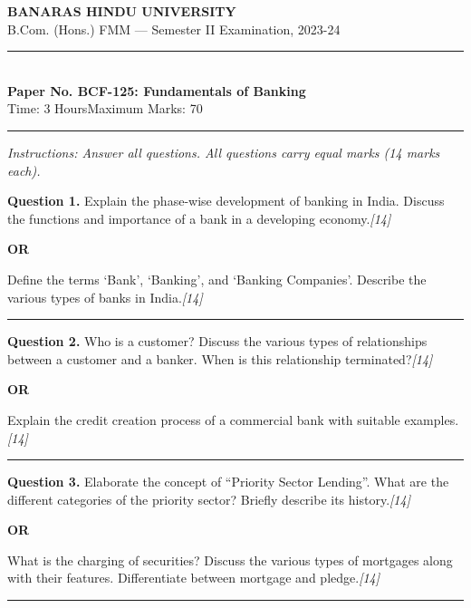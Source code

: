 \documentclass[11pt,a4paper]{article}
\newcommand{\pts}[1]{\hfill   \textit{[#1]}}
\begin{document}
\begin{center}
  {\large\bfseries BANARAS HINDU UNIVERSITY}\\[2pt]
  {\normalsize B.Com. (Hons.) FMM --- Semester II Examination, 2023-24}\\[6pt]
  \rule{0.8\linewidth}{0.5pt}\\[6pt]
  {\large\bfseries Paper No. BCF-125: Fundamentals of Banking}\\[4pt]
  {\normalsize Time: 3 Hours\hfill Maximum Marks: 70}
\end{center}

\rule{\linewidth}{0.4pt}

\smallskip



\noindent   \textit{Instructions: Answer all questions. All questions carry equal marks (14 marks each).}

\bigskip




\noindent   \textbf{Question 1.}
Explain the phase-wise development of banking in India. Discuss the functions and importance of a bank in a developing economy.\pts{14}

\centerline{   \textbf{OR}}

Define the terms `Bank', `Banking', and `Banking Companies'. Describe the various types of banks in India.\pts{14}

\medskip\rule{\linewidth}{0.2pt}




\noindent   \textbf{Question 2.}
Who is a customer? Discuss the various types of relationships between a customer and a banker. When is this relationship terminated?\pts{14}

\centerline{   \textbf{OR}}

Explain the credit creation process of a commercial bank with suitable examples.\pts{14}

\medskip\rule{\linewidth}{0.2pt}




\noindent   \textbf{Question 3.}
Elaborate the concept of ``Priority Sector Lending''. What are the different categories of the priority sector? Briefly describe its history.\pts{14}

\centerline{   \textbf{OR}}

What is the charging of securities? Discuss the various types of mortgages along with their features. Differentiate between mortgage and pledge.\pts{14}

\medskip\rule{\linewidth}{0.2pt}
\end{document}
